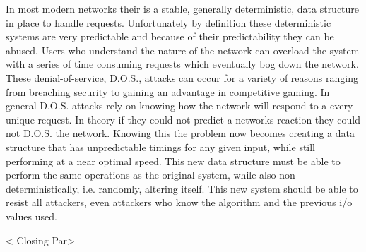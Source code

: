 \documentclass{paper}
\begin{document}
In most modern networks their is a stable, generally deterministic, data structure in place to handle requests. Unfortunately by definition these deterministic systems are very predictable and because of their predictability they can be abused. Users who understand the nature of the network can overload the system with a series of time consuming requests which eventually bog down the network. These denial-of-service, D.O.S., attacks can occur for a variety of reasons ranging from breaching security to gaining an advantage in competitive gaming. In general D.O.S. attacks rely on knowing how the network will respond to a every unique request. In theory if they could not predict a networks reaction they could not D.O.S. the network. Knowing this the problem now becomes creating a data structure that has unpredictable timings for any given input, while still performing at a near optimal speed. This new data structure must be able to perform the same operations as the original system, while also non-deterministically, i.e. randomly, altering itself. This new system should be able to resist all attackers, even attackers who know the algorithm and the previous i/o values used. 
\newline\newline

< Closing Par>
\end{document}
